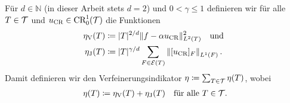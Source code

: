 \begin{definition}[Verfeinerungsindikator]
  \label{def:refinementIndicator}
  Für $d\in\mathbb{N}$ (in dieser Arbeit stets $d=2$) und $0<\gamma\leq 1$
  definieren wir für alle $T\in\mathcal{T}$ und $u_\textup{CR}\in\textup{CR}^1_0(\mathcal{T})$ die
  Funktionen
  \begin{align*}
    \eta_\text{V}(T)
    &\coloneqq
    |T|^{2/d}\Vert f-\alpha u_\textup{CR}\Vert^2_{L^2(T)}\quad\text{und }\\
    \eta_\text{J}(T)
    &\coloneqq
    |T|^{\gamma/d}\sum_{F\in\mathcal{E}(T)}\left\Vert [u_\textup{CR}]_F\right\Vert_{L^1(F)}.
  \end{align*} 
  Damit definieren wir den Verfeinerungsindikator
  $\eta\coloneqq\sum_{T\in\mathcal{T}}\eta(T)$, wobei
  \begin{align} \label{eq:refinementIndicator} 
    \eta (T)
    \coloneqq
    \eta_\text{V}(T) + \eta_\text{J}(T)\quad\text{für alle } T\in\mathcal{T}.
  \end{align} 
\end{definition}

